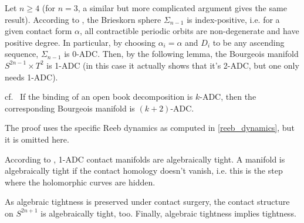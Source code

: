 Let $n \geq 4$ (for $n = 3$, a similar but more complicated argument gives the same result).
According to \cite{vK08}, the Brieskorn sphere $\Sigma_{n-1}$ is index-positive, i.e. for a given contact form $\alpha$, all contractible periodic orbits
are non-degenerate and have positive degree.
In particular, by choosing $\alpha_i = \alpha$ and $D_i$ to be any ascending sequence, $\Sigma_{n-1}$ is 0-ADC.
Then, by the following lemma, the Bourgeois manifold $S^{2n-1} \times T^2$ is 1-ADC (in this case it actually shows that it's 2-ADC, but one only needs 1-ADC).

\begin{lemma} cf.~\cite[Lemma 2.8]{BGMZ22}\label{binding_adc}
    If the binding of an open book decomposition is $k$-ADC, then the corresponding Bourgeois manifold is $(k+2)$-ADC.
\end{lemma}
The proof uses the specific Reeb dynamics as computed in \cref{reeb_dynamics}, but it is omitted here.

According to \cite[Proposition 3.2 5 (c)]{BGMZ22}, 1-ADC contact manifolds are algebraically tight.
A manifold is algebraically tight if the contact homology doesn't vanish, i.e. this is the step where the holomorphic curves are hidden.

As algebraic tightness is preserved under contact surgery, the contact structure on $S^{2n+1}$ is algebraically tight, too.
Finally, algebraic tightness implies tightness.